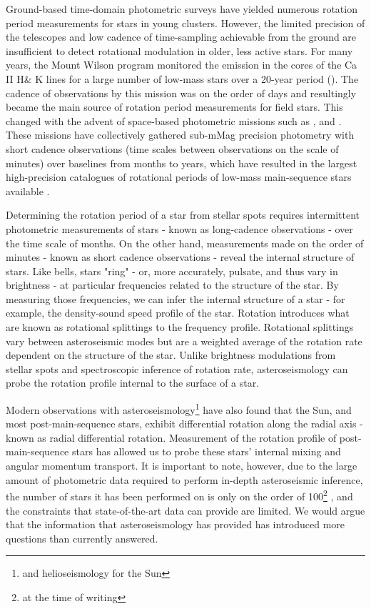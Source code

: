 Ground-based time-domain photometric surveys have yielded numerous rotation period measurements for stars in young clusters.
However, the limited precision of the telescopes and low cadence of time-sampling achievable from the ground are insufficient to detect rotational modulation in older, less active stars.
For many years, the Mount Wilson program monitored the emission in the cores of the Ca II H\& K lines for a large number of low-mass stars over a 20-year period (\citep{wilson}).
The cadence of observations by this mission was on the order of days and resultingly became the main source of rotation period measurements for field stars.
This changed with the advent of space-based photometric missions such as \corot, \kepler and \tess.
These missions have collectively gathered sub-mMag precision photometry with short cadence observations (time scales between observations on the scale of minutes) over baselines from months to years, which have resulted in the largest high-precision catalogues of rotational periods of low-mass main-sequence stars available \citep{mcquillan_etc}.

Determining the rotation period of a star from stellar spots requires intermittent photometric measurements of stars - known as long-cadence observations - over the time scale of months. 
On the other hand, measurements made on the order of minutes - known as short cadence observations - reveal the internal structure of stars.
Like bells, stars "ring" - or, more accurately, pulsate, and thus vary in brightness -  at particular frequencies related to the structure of the star.
By measuring those frequencies, we can infer the internal structure of a star - for example, the density-sound speed profile of the star.
Rotation introduces what are known as rotational splittings to the frequency profile.
Rotational splittings vary between asteroseismic modes but are a weighted average of the rotation rate dependent on the structure of the star. 
Unlike brightness modulations from stellar spots and spectroscopic inference of rotation rate, asteroseismology can probe the rotation profile internal to the surface of a star.

Modern observations with asteroseismology\footnote{and helioseismology for the Sun} have also found that the Sun, and most post-main-sequence stars, exhibit differential rotation along the radial axis - known as radial differential rotation.
Measurement of the rotation profile of post-main-sequence stars has allowed us to probe these stars' internal mixing and angular momentum transport. 
It is important to note, however, due to the large amount of photometric data required to perform in-depth asteroseismic inference, the number of stars it has been performed on is only on the order of 100\footnote{at the time of writing} \citep{li_asteroseismology_2020,li_asteroseismology_2020-1}, and the constraints that state-of-the-art data can provide are limited. We would argue that the information that asteroseismology has provided has introduced more questions than currently answered.

